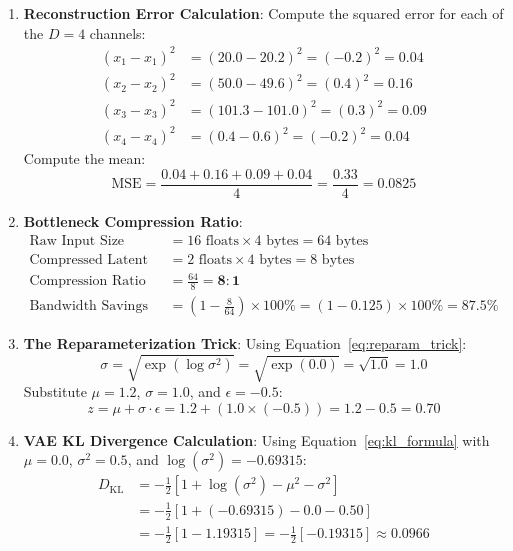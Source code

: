 \begin{enumerate}
    \item \textbf{Reconstruction Error Calculation}:
    Compute the squared error for each of the $D = 4$ channels:
    \begin{align*}
    (x_1 - \hat{x}_1)^2 &= (20.0 - 20.2)^2 = (-0.2)^2 = 0.04 \\
    (x_2 - \hat{x}_2)^2 &= (50.0 - 49.6)^2 = (0.4)^2 = 0.16 \\
    (x_3 - \hat{x}_3)^2 &= (101.3 - 101.0)^2 = (0.3)^2 = 0.09 \\
    (x_4 - \hat{x}_4)^2 &= (0.4 - 0.6)^2 = (-0.2)^2 = 0.04
    \end{align*}
    Compute the mean:
    \begin{equation*}
    \text{MSE} = \frac{0.04 + 0.16 + 0.09 + 0.04}{4} = \frac{0.33}{4} = \mathbf{0.0825}
    \end{equation*}

    \item \textbf{Bottleneck Compression Ratio}:
    \begin{align*}
    \text{Raw Input Size} &= 16 \text{ floats} \times 4 \text{ bytes} = 64 \text{ bytes} \\
    \text{Compressed Latent Size} &= 2 \text{ floats} \times 4 \text{ bytes} = 8 \text{ bytes} \\
    \text{Compression Ratio} &= \frac{64}{8} = \mathbf{8:1} \\
    \text{Bandwidth Savings} &= \left(1 - \frac{8}{64}\right) \times 100\% = (1 - 0.125) \times 100\% = \mathbf{87.5\%}
    \end{align*}

    \item \textbf{The Reparameterization Trick}:
    Using Equation~\eqref{eq:reparam_trick}:
    \begin{equation*}
    \sigma = \sqrt{\exp(\log\sigma^2)} = \sqrt{\exp(0.0)} = \sqrt{1.0} = 1.0
    \end{equation*}
    Substitute $\mu = 1.2$, $\sigma = 1.0$, and $\epsilon = -0.5$:
    \begin{equation*}
    z = \mu + \sigma \cdot \epsilon = 1.2 + (1.0 \times (-0.5)) = 1.2 - 0.5 = \mathbf{0.70}
    \end{equation*}

    \item \textbf{VAE KL Divergence Calculation}:
    Using Equation~\eqref{eq:kl_formula} with $\mu = 0.0$, $\sigma^2 = 0.5$, and $\log(\sigma^2) = -0.69315$:
    \begin{align*}
    D_{\text{KL}} &= -\frac{1}{2} \left[ 1 + \log(\sigma^2) - \mu^2 - \sigma^2 \right] \\
                  &= -\frac{1}{2} \left[ 1 + (-0.69315) - 0.0 - 0.50 \right] \\
                  &= -\frac{1}{2} \left[ 1 - 1.19315 \right] = -\frac{1}{2} [-0.19315] \approx \mathbf{0.0966}
    \end{align*}


\end{enumerate}
